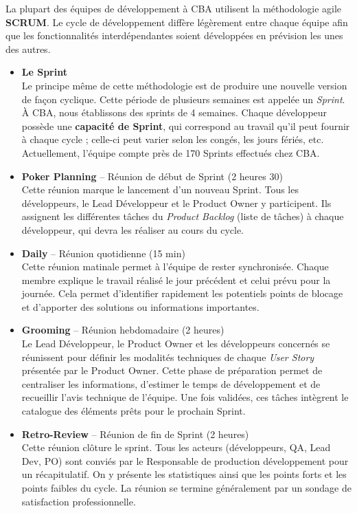 \documentclass{article}
\begin{document}
La plupart des équipes de développement à CBA utilisent la méthodologie agile \textbf{SCRUM}. Le cycle de développement diffère légèrement entre chaque équipe afin que les fonctionnalités interdépendantes soient développées en prévision les unes des autres. 

\begin{itemize}
    \item \textbf{Le Sprint} \\
    Le principe même de cette méthodologie est de produire une nouvelle version de façon cyclique. Cette période de plusieurs semaines est appelée un \textit{Sprint}. À CBA, nous établissons des sprints de 4 semaines. Chaque développeur possède une \textbf{capacité de Sprint}, qui correspond au travail qu'il peut fournir à chaque cycle ; celle-ci peut varier selon les congés, les jours fériés, etc. Actuellement, l'équipe compte près de 170 Sprints effectués chez CBA.

    \item \textbf{Poker Planning} -- Réunion de début de Sprint (2 heures 30) \\
    Cette réunion marque le lancement d'un nouveau Sprint. Tous les développeurs, le Lead Développeur et le Product Owner y participent. Ils assignent les différentes tâches du \textit{Product Backlog} (liste de tâches) à chaque développeur, qui devra les réaliser au cours du cycle.

    \item \textbf{Daily} -- Réunion quotidienne (15 min) \\
    Cette réunion matinale permet à l'équipe de rester synchronisée. Chaque membre explique le travail réalisé le jour précédent et celui prévu pour la journée. Cela permet d'identifier rapidement les potentiels points de blocage et d'apporter des solutions ou informations importantes.

    \item \textbf{Grooming} -- Réunion hebdomadaire (2 heures) \\
    Le Lead Développeur, le Product Owner et les développeurs concernés se réunissent pour définir les modalités techniques de chaque \textit{User Story} présentée par le Product Owner. Cette phase de préparation permet de centraliser les informations, d'estimer le temps de développement et de recueillir l'avis technique de l'équipe. Une fois validées, ces tâches intègrent le catalogue des éléments prêts pour le prochain Sprint.

    \item \textbf{Retro-Review} -- Réunion de fin de Sprint (2 heures) \\
    Cette réunion clôture le sprint. Tous les acteurs (développeurs, QA, Lead Dev, PO) sont conviés par le Responsable de production développement pour un récapitulatif. On y présente les statistiques ainsi que les points forts et les points faibles du cycle. La réunion se termine généralement par un sondage de satisfaction professionnelle.
\end{itemize}
\end{document}
